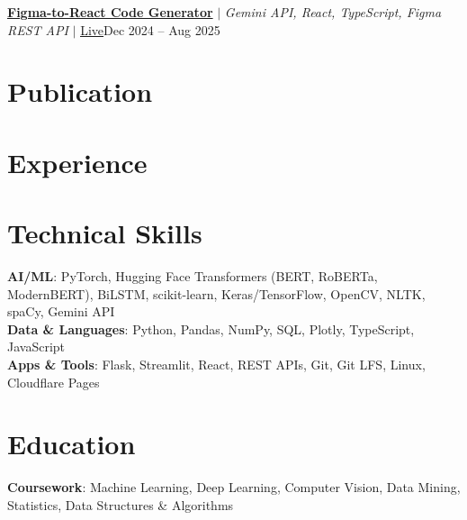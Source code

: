 \documentclass[a4paper]{article}
\begin{document}
      \resumeProjectHeading
        {\href{https://github.com/ep0chzero/figma-metadata-viewer/tree/ai-code-gen}{\textbf{Figma-to-React Code Generator}} $|$ \emph{Gemini API, React, TypeScript, Figma REST API} $|$ \href{https://figma-metadata-viewer.pages.dev}{\underline{Live}}}{Dec 2024 -- Aug 2025}
      \resumeItemListStart
      \resumeItemListEnd
    \resumeSubHeadingListEnd
\vspace{-4pt}

\section{Publication}
\begin{resumeBlock}
\pubMediSense
\end{resumeBlock}
\vspace{-6pt}

\section{Experience}
  \resumeSubHeadingListStart
    \jobTechMahindra
      \resumeItemListStart
      \resumeItemListEnd
    \jobGenpact
      \resumeItemListStart
      \resumeItemListEnd
  \resumeSubHeadingListEnd
\vspace{-4pt}

\section{Technical Skills}
\begin{resumeBlock}
\textbf{AI/ML}{: PyTorch, Hugging Face Transformers (BERT, RoBERTa, ModernBERT), BiLSTM, scikit-learn, Keras/TensorFlow, OpenCV, NLTK, spaCy, Gemini API} \\
\textbf{Data \& Languages}{: Python, Pandas, NumPy, SQL, Plotly, TypeScript, JavaScript} \\
\textbf{Apps \& Tools}{: Flask, Streamlit, React, REST APIs, Git, Git LFS, Linux, Cloudflare Pages}
\end{resumeBlock}
\vspace{-6pt}

\section{Education}
  \resumeSubHeadingListStart
    \eduGNIT
  \resumeSubHeadingListEnd
\vspace{-8pt}
\begin{resumeBlock}
\textbf{Coursework}{: Machine Learning, Deep Learning, Computer Vision, Data Mining, Statistics, Data Structures \& Algorithms}
\end{resumeBlock}
\end{document}
